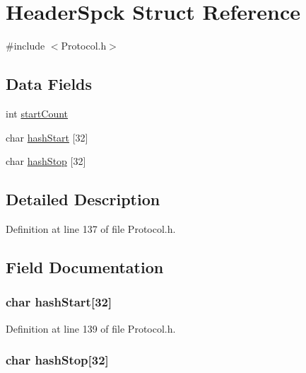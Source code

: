 \hypertarget{struct_header_spck}{
\section{HeaderSpck Struct Reference}
\label{struct_header_spck}
}


{\ttfamily \#include $<$Protocol.h$>$}

\subsection*{Data Fields}
\begin{DoxyCompactItemize}
\item 
int \hyperlink{struct_header_spck_a9d86e57aaa1003de664fdbe3fe6bc35a}{startCount}
\item 
char \hyperlink{struct_header_spck_afb278e99e58307608e33751cd490c97b}{hashStart} \mbox{[}32\mbox{]}
\item 
char \hyperlink{struct_header_spck_aa16ea670ce42c626f461fc49f74ddcd3}{hashStop} \mbox{[}32\mbox{]}
\end{DoxyCompactItemize}


\subsection{Detailed Description}


Definition at line 137 of file Protocol.h.



\subsection{Field Documentation}
\hypertarget{struct_header_spck_afb278e99e58307608e33751cd490c97b}{
\subsubsection[{hashStart}]{\setlength{\rightskip}{0pt plus 5cm}char {\bf hashStart}\mbox{[}32\mbox{]}}}
\label{struct_header_spck_afb278e99e58307608e33751cd490c97b}


Definition at line 139 of file Protocol.h.

\hypertarget{struct_header_spck_aa16ea670ce42c626f461fc49f74ddcd3}{
\subsubsection[{hashStop}]{\setlength{\rightskip}{0pt plus 5cm}char {\bf hashStop}\mbox{[}32\mbox{]}}}
\label{struct_header_spck_aa16ea670ce42c626f461fc49f74ddcd3}


